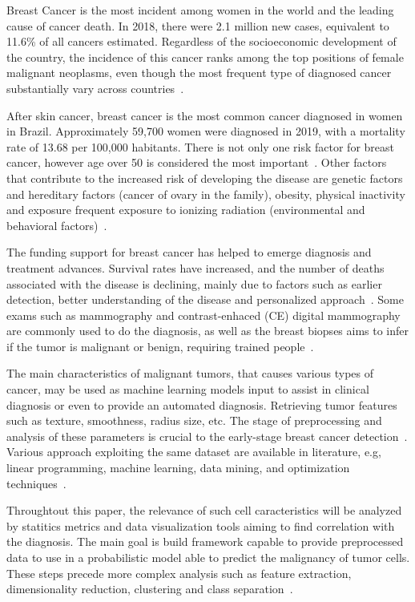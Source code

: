 \documentclass[conference]{IEEEtran}
\begin{document}
Breast Cancer is the most incident among women in the world and the leading cause of cancer death. In 2018, there were 2.1 million new cases, equivalent to 11.6\% of all cancers estimated. Regardless of the socioeconomic development of the country, the incidence of this cancer ranks among the top positions of female malignant neoplasms, even though the most frequent type of diagnosed cancer substantially vary across countries~\cite{Bray2018}.

After skin cancer, breast cancer is the most common cancer diagnosed in women in Brazil. Approximately 59,700 women were diagnosed in 2019, with a mortality rate of 13.68 per 100,000 habitants. There is not only one risk factor for breast cancer, however age over 50 is considered the most important~\cite{INCA2019}. Other factors that contribute to the increased risk of developing the disease are genetic factors and hereditary factors (cancer of ovary in the family), obesity, physical inactivity and exposure frequent exposure to ionizing radiation (environmental and behavioral factors)~\cite{Bray2018, INCA2019}.

The funding support for breast cancer has helped to emerge diagnosis and treatment advances. Survival rates have increased, and the number of deaths associated with the disease is declining, mainly due to factors such as earlier detection, better understanding of the disease and personalized approach~\cite{Rivera2018}. Some exams such as mammography and contrast-enhaced (CE) digital mammography are commonly used to do the diagnosis, as well as the breast biopses aims to infer if the tumor is malignant or benign, requiring trained people~\cite{Sledge2014, Cardoso2014}.

The main characteristics of malignant tumors, that causes various types of cancer, may be used as machine learning models input to assist in clinical diagnosis or even to provide an automated diagnosis. Retrieving tumor features such as texture, smoothness, radius size, etc. The stage of preprocessing and analysis of these parameters is crucial to the early-stage breast cancer detection~\cite{Street1993}. Various approach exploiting the same dataset are available in literature, e.g, linear programming, machine learning, data mining, and optimization techniques~\cite{Bennett1992, Wolberg1994, Mangasarian1995}.

Throughtout this paper, the relevance of such cell caracteristics will be analyzed by statitics metrics and data visualization tools 
aiming to find correlation with the diagnosis. The main goal is build framework capable to provide preprocessed data to use in a probabilistic model able to predict the malignancy of tumor cells. These steps precede more complex analysis such as feature extraction, dimensionality reduction, clustering and class separation~\cite{Hastie2009, Kuhn2013, James2013}.
\end{document}
